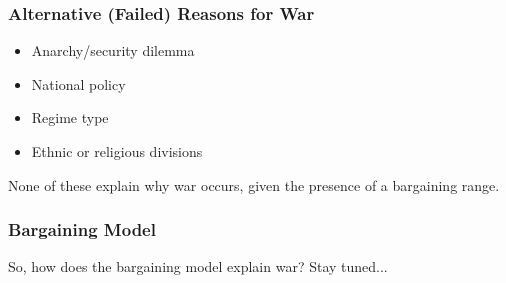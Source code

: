 \documentclass{beamer}
\begin{document}
\begin{frame} 
	\frametitle{\LARGE{Alternative (Failed) Reasons for War}}
	\begin{itemize}
		\item Anarchy/security dilemma \pause
		\item National policy \pause
		\item Regime type \pause
		\item Ethnic or religious divisions \pause	
	\end{itemize}
None of these explain why war occurs, given the presence of a bargaining range.
\end{frame}

\begin{frame} 
\frametitle{\LARGE{Bargaining Model}}
So, how does the bargaining model explain war? Stay tuned...
\end{frame}
\end{document}
